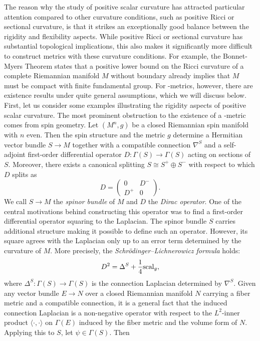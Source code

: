 The reason why the study of positive scalar curvature has attracted particular attention compared to other curvature conditions, such as positive Ricci or sectional curvature, is that it strikes an exceptionally good balance between the rigidity and flexibility aspects. While positive Ricci or sectional curvature has substantial topological implications, this also makes it significantly more difficult to construct metrics with these curvature conditions. For example, the Bonnet-Myers Theorem states that a positive lower bound on the Ricci curvature of a complete Riemannian manifold $M$ without boundary already implies that $M$ must be compact with finite fundamental group. For \psc-metrics, however, there are existence results under quite general assumptions, which we will discuss below. First, let us consider some examples illustrating the rigidity aspects of positive scalar curvature. The most prominent obstruction to the existence of a \psc-metric comes from spin geometry. Let $(M^n,g)$ be a closed Riemannian spin manifold with $n$ even. Then the spin structure and the metric $g$ determine a Hermitian vector bundle $S \to M$ together with a compatible connection $\nabla^S$ and a self-adjoint first-order differential operator $D \colon \Gamma(S) \to \Gamma(S)$ acting on sections of $S$. Moreover, there exists a canonical splitting $S \cong S^+ \oplus S^-$ with respect to which $D$ splits as
\[
D = \begin{pmatrix}
    0 & D^- \\
    D^+ & 0
\end{pmatrix}.
\]
We call $S \to M$ the \textit{spinor bundle} of $M$ and $D$ the \textit{Dirac operator}. One of the central motivations behind constructing this operator was to find a first-order differential operator squaring to the Laplacian. The spinor bundle $S$ carries additional structure making it possible to define such an operator. However, its square agrees with the Laplacian only up to an error term determined by the curvature of $M$. More precisely, the \textit{Schrödinger--Lichnerowicz formula} holds:
\[
D^2 = \Delta^S + \frac{1}{4} \mathrm{scal}_g,
\]
where $\Delta^S \colon \Gamma(S) \to \Gamma(S)$ is the connection Laplacian determined by $\nabla^S$. Given any vector bundle $E \to N$ over a closed Riemannian manifold $N$ carrying a fiber metric and a compatible connection, it is a general fact that the induced connection Laplacian is a non-negative operator with respect to the $L^2$-inner product $\langle\cdot,\cdot\rangle$ on $\Gamma(E)$ induced by the fiber metric and the volume form of $N$. Applying this to $S$, let $\psi \in \Gamma(S)$. Then
